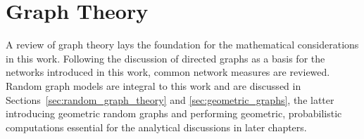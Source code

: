 \chapter{Graph Theory}\label{ch:Graph_theory} 

A review of graph theory lays the foundation for the mathematical
considerations in this work. Following the discussion of directed
graphs as a basis for the networks introduced in this work, common network
measures are reviewed. Random graph models are integral to this work and are
discussed in Sections~\ref{sec:random_graph_theory} and
\ref{sec:geometric_graphs}, the latter introducing geometric random
graphs and performing geometric, probabilistic computations essential
for the analytical discussions in later chapters. 























% 





